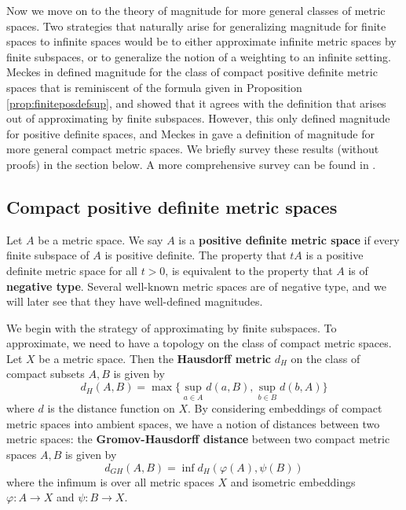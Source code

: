 \documentclass[11pt]{article}
\theoremstyle{mythm}
\begin{document}
Now we move on to the theory of magnitude for more general classes of metric spaces. Two strategies that naturally arise for generalizing magnitude for finite spaces to infinite spaces would be to either approximate infinite metric spaces by finite subspaces, or to generalize the notion of a weighting to an infinite setting. Meckes in \cite{meckes_positive_2013} defined magnitude for the class of compact positive definite metric spaces that is reminiscent of the formula given in Proposition \ref{prop:finiteposdefsup}, and showed that it agrees with the definition that arises out of approximating by finite subspaces. However, this only defined magnitude for positive definite spaces, and Meckes in \cite{meckes_magnitude_2015} gave a definition of magnitude for more general compact metric spaces. We briefly survey these results (without proofs) in the section below. A more comprehensive survey can be found in \cite{leinster_magnitude_2017}.

\subsection{Compact positive definite metric spaces}

Let $A$ be a metric space. We say $A$ is a \textbf{positive definite metric space} if every finite subspace of $A$ is positive definite. The property that $tA$ is a positive definite metric space for all $t > 0$, is equivalent to the property that $A$ is of \textbf{negative type}. Several well-known metric spaces are of negative type, and we will later see that they have well-defined magnitudes.

We begin with the strategy of approximating by finite subspaces. To approximate, we need to have a topology on the class of compact metric spaces. Let $X$ be a metric space. Then the \textbf{Hausdorff metric} $d_H$ on the class of compact subsets $A,B$ is given by
\begin{equation*}
d_H(A,B) = \max\{\sup\limits_{a\in A}d(a,B),\sup\limits_{b\in B}d(b,A)\}
\end{equation*}
where $d$ is the distance function on $X$. By considering embeddings of compact metric spaces into ambient spaces, we have a notion of distances between two metric spaces: the \textbf{Gromov-Hausdorff distance} between two compact metric spaces $A,B$ is given by
\begin{equation*}
d_{GH}(A,B) = \inf d_H(\varphi(A),\psi(B))
\end{equation*}
where the infimum is over all metric spaces $X$ and isometric embeddings $\varphi:A \to X$ and $\psi: B \to X$.
\end{document}

